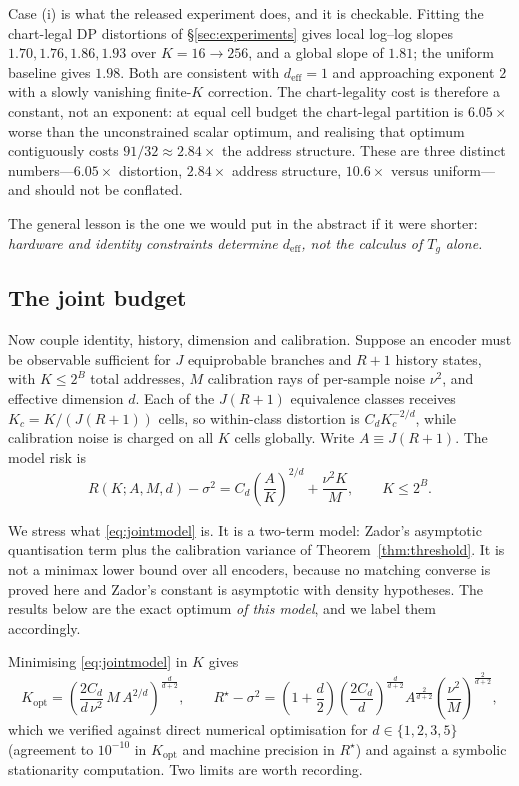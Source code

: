 \documentclass[11pt]{article}
\begin{document}
Case (i) is what the released experiment does, and it is checkable. Fitting the chart-legal
DP distortions of \S\ref{sec:experiments} gives local log--log slopes
$1.70,1.76,1.86,1.93$ over $K=16\to256$, and a global slope of $1.81$; the uniform baseline
gives $1.98$. Both are consistent with $d_{\mathrm{eff}}=1$ and approaching exponent $2$
with a slowly vanishing finite-$K$ correction. The chart-legality cost is
therefore a constant, not an exponent: at equal cell budget the chart-legal partition is
$6.05\times$ worse than the unconstrained scalar optimum, and realising that optimum
contiguously costs $91/32\approx2.84\times$ the address structure. These are three
distinct numbers---$6.05\times$ distortion, $2.84\times$ address structure, $10.6\times$
versus uniform---and should not be conflated.

The general lesson is the one we would put in the abstract if it were shorter:
\emph{hardware and identity constraints determine $d_{\mathrm{eff}}$, not the calculus of
$T_g$ alone.}

\subsection{The joint budget}

Now couple identity, history, dimension and calibration. Suppose an encoder must be
observable sufficient for $J$ equiprobable branches and $R+1$ history states, with
$K\le 2^{B}$ total addresses, $M$ calibration rays of per-sample noise $\nu^{2}$, and
effective dimension $d$. Each of the $J(R+1)$ equivalence classes receives
$K_c=K/(J(R+1))$ cells, so within-class distortion is $C_dK_c^{-2/d}$, while calibration
noise is charged on all $K$ cells globally. Write $A \equiv J(R+1)$. The model risk is
\begin{equation}
R(K;A,M,d)-\sigma^{2} = C_d\left(\frac{A}{K}\right)^{2/d}+\frac{\nu^{2}K}{M},
\qquad K\le 2^{B}.
\label{eq:jointmodel}
\end{equation}

We stress what \eqref{eq:jointmodel} is. It is a two-term model: Zador's asymptotic
quantisation term plus the calibration variance of Theorem~\ref{thm:threshold}. It is not a
minimax lower bound over all encoders, because no matching converse is proved here and
Zador's constant is asymptotic with density hypotheses. The results below are the exact
optimum \emph{of this model}, and we label them accordingly.

Minimising \eqref{eq:jointmodel} in $K$ gives
\begin{equation}
K_{\mathrm{opt}} = \left(\frac{2C_d}{d\,\nu^{2}}\,M\,A^{2/d}\right)^{\frac{d}{d+2}},
\qquad
R^{\star}-\sigma^{2} = \left(1+\frac{d}{2}\right)
\left(\frac{2C_d}{d}\right)^{\frac{d}{d+2}}
A^{\frac{2}{d+2}}\left(\frac{\nu^{2}}{M}\right)^{\frac{2}{d+2}},
\label{eq:jointopt}
\end{equation}
which we verified against direct numerical optimisation for $d\in\{1,2,3,5\}$ (agreement
to $10^{-10}$ in $K_{\mathrm{opt}}$ and machine precision in $R^{\star}$) and against a
symbolic stationarity computation. Two limits are worth recording.
\end{document}
